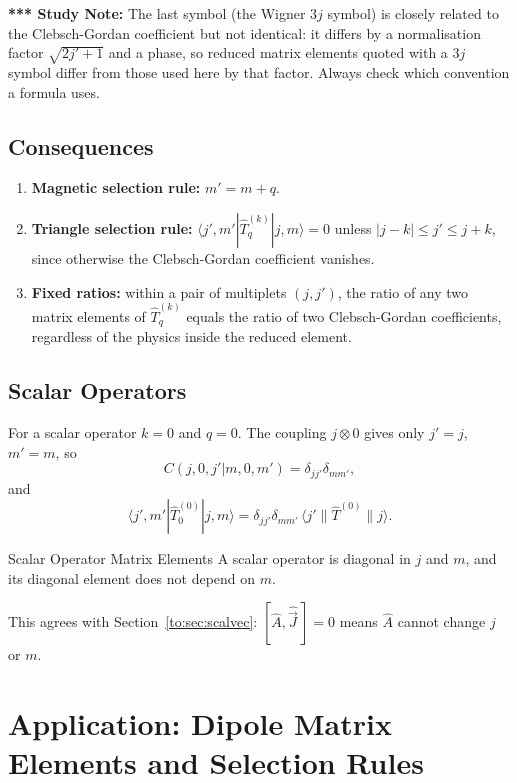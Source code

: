 \documentclass[11pt,a4paper]{article}
\begin{document}
\textbf{*** Study Note:} The last symbol (the Wigner $3j$ symbol) is closely related to the Clebsch-Gordan coefficient but not identical: it differs by a normalisation factor $\sqrt{2j'+1}$ and a phase, so reduced matrix elements quoted with a $3j$ symbol differ from those used here by that factor. Always check which convention a formula uses.

\subsection{Consequences}
\begin{enumerate}[leftmargin=2em,itemsep=2pt]
\item \textbf{Magnetic selection rule:} $m'=m+q$.
\item \textbf{Triangle selection rule:} $\langle j',m'|\hat T^{(k)}_q|j,m\rangle=0$ unless $|j-k|\le j'\le j+k$, since otherwise the Clebsch-Gordan coefficient vanishes.
\item \textbf{Fixed ratios:} within a pair of multiplets $(j,j')$, the ratio of any two matrix elements of $\hat T^{(k)}_q$ equals the ratio of two Clebsch-Gordan coefficients, regardless of the physics inside the reduced element.
\end{enumerate}

\subsection{Scalar Operators}
For a scalar operator $k=0$ and $q=0$. The coupling $j\otimes0$ gives only $j'=j$, $m'=m$, so
\[
C(j,0,j'|m,0,m')=\delta_{jj'}\delta_{mm'},
\]
and
\[
\langle j',m'|\hat T^{(0)}_0|j,m\rangle=\delta_{jj'}\delta_{mm'}\,\langle j'\|\hat T^{(0)}\|j\rangle .
\]
\begin{thm}{Scalar Operator Matrix Elements}
A scalar operator is diagonal in $j$ and $m$, and its diagonal element does not depend on $m$.
\end{thm}

This agrees with Section~\ref{to:sec:scalvec}: $[\hat A,\hat{\vec J}\,]=0$ means $\hat A$ cannot change $j$ or $m$.

\section{Application: Dipole Matrix Elements and Selection Rules}
\label{to:sec:dipole}
\end{document}
